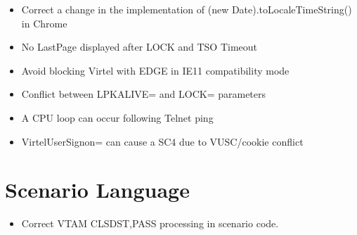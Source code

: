 \documentclass[letterpaper,10pt,english]{sphinxmanual}
\begin{document}
\begin{itemize}
\item {} 
Correct a change in the implementation of (new Date).toLocaleTimeString() in Chrome

\end{itemize}

\begin{itemize}
\item {} 
No LastPage displayed after LOCK and TSO Timeout

\end{itemize}

\begin{itemize}
\item {} 
Avoid blocking Virtel with EDGE in IE11 compatibility mode

\end{itemize}

\begin{itemize}
\item {} 
Conflict between LPKALIVE= and LOCK= parameters

\end{itemize}

\begin{itemize}
\item {} 
A CPU loop can occur following Telnet ping

\end{itemize}

\begin{itemize}
\item {} 
VirtelUserSignon= can cause a SC4 due to VUSC/cookie conflict

\end{itemize}

\newpage


\section{Scenario Language}
\label{\detokenize{TN202303:scenario-language}}
\begin{itemize}
\item {} 
Correct VTAM CLSDST,PASS processing in scenario code.

\end{itemize}
\end{document}
